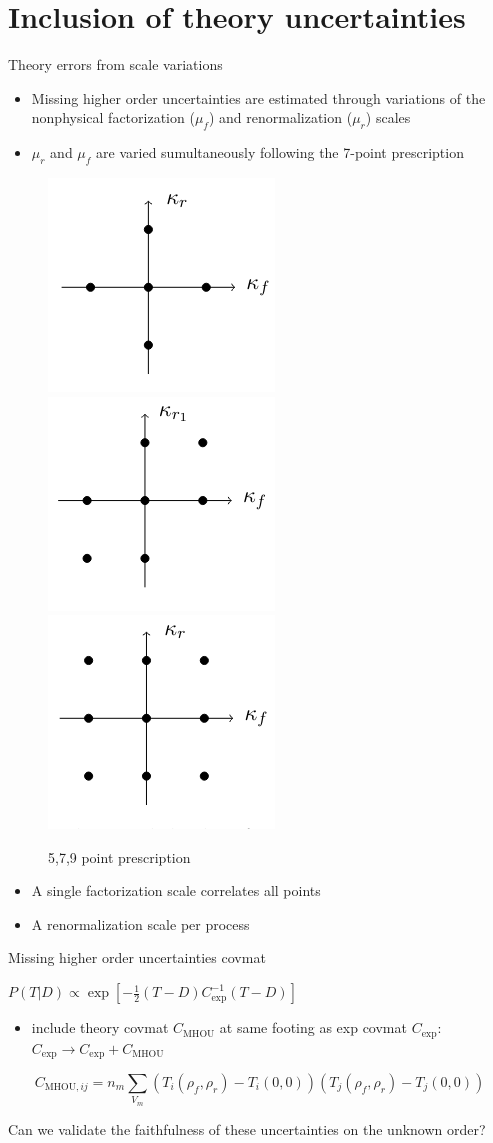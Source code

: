 \documentclass[aspectratio=169, 9pt,t]{beamer}
\begin{document}
\section{Inclusion of theory uncertainties}

\begin{frame}{Theory errors from scale variations}
  \begin{itemize}
    \item Missing higher order uncertainties are estimated through variations of the nonphysical factorization ($\mu_f$) and renormalization ($\mu_r$) scales
    \item $\mu_r$ and $\mu_f$ are varied sumultaneously following the 7-point prescription
  \end{itemize}
  \begin{figure}
    \includegraphics[width=.2\textwidth]{figures/5point.png}
    \includegraphics[width=.2\textwidth]{figures/7point.png}
    \includegraphics[width=.2\textwidth]{figures/9point.png}
    \caption*{5,7,9 point prescription}
  \end{figure}
  \begin{itemize}
    \item A single factorization scale correlates all points
    \item A renormalization scale per process
  \end{itemize}
\end{frame}

\begin{frame}{Missing higher order uncertainties covmat}

  $P(T|D) \propto \exp\left[-\frac{1}{2}\left(T-D\right)C_\mathrm{exp}^{-1}\left(T-D\right)\right]$
  \begin{itemize}
    \item include theory covmat $C_\mathrm{MHOU}$ at same footing as exp covmat $C_\mathrm{exp}$: $C_\mathrm{exp}\rightarrow C_\mathrm{exp}+C_\mathrm{MHOU}$
  \end{itemize}
  $$C_{\mathrm{MHOU},ij} = n_{m}\sum_{V_{m}}\left(T_{i}(\rho_f, \rho_r) - T_{i}(0, 0)\right)\left(T_{j}(\rho_f, \rho_r) - T_{j}(0, 0)\right)$$

  Can we validate the faithfulness of these uncertainties on the unknown order?

\end{frame}
\end{document}

